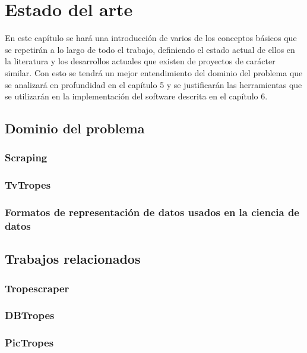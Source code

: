 \chapter{Estado del arte}

En este capítulo se hará una introducción de varios de los conceptos básicos que
se repetirán a lo largo de todo el trabajo, definiendo el estado actual de ellos
en la literatura y los desarrollos actuales que existen de proyectos de carácter
similar. Con esto se tendrá un mejor entendimiento del dominio del problema que
se analizará en profundidad en el capítulo 5 y se justificarán las herramientas
que se utilizarán en la implementación del software descrita en el capítulo 6.

\section{Dominio del problema}
\subsection{Scraping}
\subsection{TvTropes}
\subsection{Formatos de representación de datos usados en la ciencia de datos}
\section{Trabajos relacionados}
\subsection{Tropescraper}
\subsection{DBTropes}
\subsection{PicTropes}